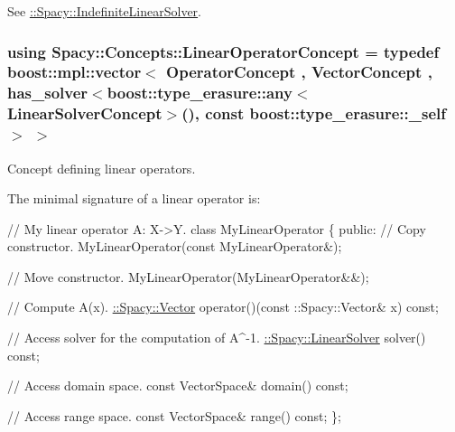 See \hyperlink{namespaceSpacy_a168383be933a8316169c145f5e419604_IndefiniteLinearSolverAnchor}{\+:\+:Spacy\+:\+:Indefinite\+Linear\+Solver}. \hypertarget{group__ConceptGroup_gaf0e18e41c434cfceb77ccb8e785a8055_gaf0e18e41c434cfceb77ccb8e785a8055}{}
\subsubsection[{Linear\+Operator\+Concept}]{\setlength{\rightskip}{0pt plus 5cm}using {\bf Spacy\+::\+Concepts\+::\+Linear\+Operator\+Concept} = typedef boost\+::mpl\+::vector$<$ Operator\+Concept , Vector\+Concept , has\+\_\+solver$<$boost\+::type\+\_\+erasure\+::any$<$Linear\+Solver\+Concept$>$(), const boost\+::type\+\_\+erasure\+::\+\_\+self$>$ $>$}\label{group__ConceptGroup_gaf0e18e41c434cfceb77ccb8e785a8055_gaf0e18e41c434cfceb77ccb8e785a8055}


Concept defining linear operators. 

\label{group__ConceptGroup_gaf0e18e41c434cfceb77ccb8e785a8055_LinearOperatorConceptAnchor}%
\hypertarget{group__ConceptGroup_gaf0e18e41c434cfceb77ccb8e785a8055_LinearOperatorConceptAnchor}{}%
The minimal signature of a linear operator is\+: 
\begin{DoxyCode}
\textcolor{comment}{// My linear operator A: X->Y.}
\textcolor{keyword}{class }MyLinearOperator
\{
\textcolor{keyword}{public}:
  \textcolor{comment}{// Copy constructor.}
  MyLinearOperator(\textcolor{keyword}{const} MyLinearOperator&);

  \textcolor{comment}{// Move constructor.}
  MyLinearOperator(MyLinearOperator&&);

  \textcolor{comment}{// Compute A(x).}
  \hyperlink{classSpacy_1_1Vector}{::Spacy::Vector} operator()(const ::Spacy::Vector& x) \textcolor{keyword}{const};

  \textcolor{comment}{// Access solver for the computation of A^-1.}
  \hyperlink{namespaceSpacy_a7d5cd1c6fb9dd85aa345b536caf30bba_a7d5cd1c6fb9dd85aa345b536caf30bba}{::Spacy::LinearSolver} solver() \textcolor{keyword}{const};

  \textcolor{comment}{// Access domain space.}
  \textcolor{keyword}{const} VectorSpace& domain() \textcolor{keyword}{const};

  \textcolor{comment}{// Access range space.}
  \textcolor{keyword}{const} VectorSpace& range() \textcolor{keyword}{const};
\};
\end{DoxyCode}


